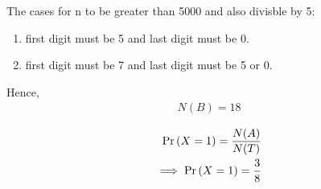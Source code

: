 \documentclass{article}
\begin{document}
The cases for n to be greater than 5000 and also divisble by 5:
\begin{enumerate}
\item first digit must be 5 and last digit must be 0.
\item first digit must be 7 and last digit must be 5 or 0.
\end{enumerate}
Hence,
\begin{align}
	N(B)=18
\end{align}

\begin{align}
	\Pr\left(X=1\right)=\frac{N(A)}{N(T)}\\
	\implies \Pr\left(X=1\right)=\frac{3}{8}
\end{align}
\end{document}
